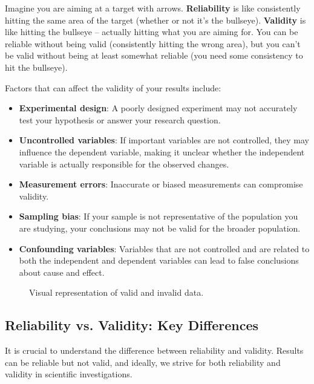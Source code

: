  Imagine you are aiming at a target with arrows.  \textbf{Reliability} is like consistently hitting the same area of the target (whether or not it's the bullseye). \textbf{Validity} is like hitting the bullseye – actually hitting what you are aiming for. You can be reliable without being valid (consistently hitting the wrong area), but you can't be valid without being at least somewhat reliable (you need some consistency to hit the bullseye).

Factors that can affect the validity of your results include:

\begin{itemize}
    \item \textbf{Experimental design}: A poorly designed experiment may not accurately test your hypothesis or answer your research question.
    \item \textbf{Uncontrolled variables}: If important variables are not controlled, they may influence the dependent variable, making it unclear whether the independent variable is actually responsible for the observed changes.
    \item \textbf{Measurement errors}:  Inaccurate or biased measurements can compromise validity.
    \item \textbf{Sampling bias}: If your sample is not representative of the population you are studying, your conclusions may not be valid for the broader population.
    \item \textbf{Confounding variables}: Variables that are not controlled and are related to both the independent and dependent variables can lead to false conclusions about cause and effect.
\end{itemize}

\begin{figure}
\centering
{}
\caption{Visual representation of valid and invalid data.}
\end{figure}

\subsection{Reliability vs. Validity: Key Differences}

It is crucial to understand the difference between reliability and validity.  Results can be reliable but not valid, and ideally, we strive for both reliability and validity in scientific investigations.

